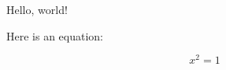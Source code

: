 \documentclass{article} %
\begin{document}
Hello, world!

Here is an equation:

\[
x ^ 2 = 1
\]
\end{document}
